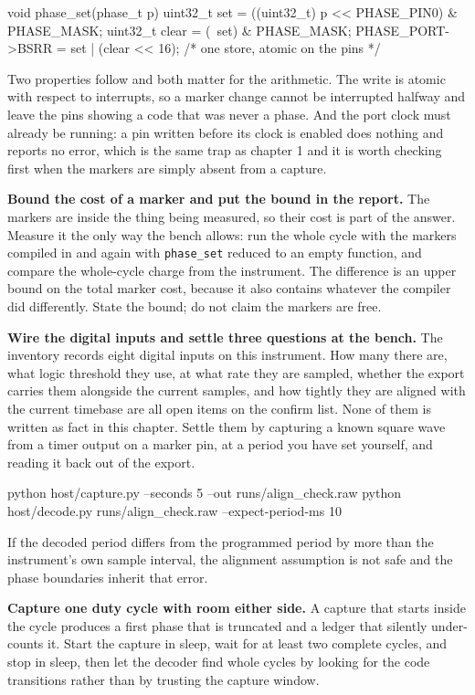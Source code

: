 \begin{steps}
\begin{ccode}
void phase_set(phase_t p)
{
    uint32_t set   = ((uint32_t) p << PHASE_PIN0) & PHASE_MASK;
    uint32_t clear = (~set) & PHASE_MASK;
    PHASE_PORT->BSRR = set | (clear << 16);   /* one store, atomic on the pins */
}
\end{ccode}
Two properties follow and both matter for the arithmetic. The write is atomic
with respect to interrupts, so a marker change cannot be interrupted halfway and
leave the pins showing a code that was never a phase. And the port clock must
already be running: a pin written before its clock is enabled does nothing and
reports no error, which is the same trap as chapter 1 and it is worth checking
first when the markers are simply absent from a capture.

\item \textbf{Bound the cost of a marker and put the bound in the report.} The
markers are inside the thing being measured, so their cost is part of the
answer. Measure it the only way the bench allows: run the whole cycle with the
markers compiled in and again with \texttt{phase\_set} reduced to an empty
function, and compare the whole-cycle charge from the instrument. The difference
is an upper bound on the total marker cost, because it also contains whatever
the compiler did differently. State the bound; do not claim the markers are
free.

\item \textbf{Wire the digital inputs and settle three questions at the bench.}
The inventory records eight digital inputs on this instrument. How many there
are, what logic threshold they use, at what rate they are sampled, whether the
export carries them alongside the current samples, and how tightly they are
aligned with the current timebase are all open items on the confirm list. None
of them is written as fact in this chapter. Settle them by capturing a known
square wave from a timer output on a marker pin, at a period you have set
yourself, and reading it back out of the export.
\begin{shellcode}
python host/capture.py --seconds 5 --out runs/align_check.raw
python host/decode.py runs/align_check.raw --expect-period-ms 10
\end{shellcode}
If the decoded period differs from the programmed period by more than the
instrument's own sample interval, the alignment assumption is not safe and the
phase boundaries inherit that error.

\item \textbf{Capture one duty cycle with room either side.} A capture that
starts inside the cycle produces a first phase that is truncated and a ledger
that silently under-counts it. Start the capture in sleep, wait for at least two
complete cycles, and stop in sleep, then let the decoder find whole cycles by
looking for the code transitions rather than by trusting the capture window.


\end{steps}
